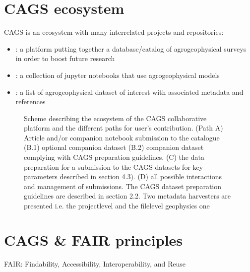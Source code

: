 \documentclass[letterpaper,10pt,english]{sphinxmanual}
\begin{document}
\chapter{CAGS ecosystem}
\label{\detokenize{CAGS_ecosystem:cags-ecosystem}}\label{\detokenize{CAGS_ecosystem::doc}}
\sphinxAtStartPar
CAGS is an ecosystem with many interrelated projects and repositories:
\begin{itemize}
\item {} 
\sphinxAtStartPar
{}: a platform putting together a database/catalog of agrogeophysical surveys in order to boost future research

\item {} 
\sphinxAtStartPar
{}: a collection of jupyter notebooks that use agrogeophysical models

\end{itemize}

\sphinxAtStartPar
{}
\begin{itemize}
\item {} 
\sphinxAtStartPar
{}: a list of agrogeophysical dataset of interest with associated metadata and references

\end{itemize}

\sphinxAtStartPar
{}

\begin{figure}[htbp]
\centering
\capstart

\noindent{}
\caption{Scheme describing the ecosystem of the CAGS collaborative platform and the different paths for user’s contribution. (Path A) Article and/or companion notebook submission to the catalogue (B.1) optional companion dataset (B.2) companion dataset complying with CAGS preparation guidelines. (C) the data preparation for a submission to the CAGS datasets for key parameters described in section 4.3). (D) all possible interactions and management of submissions. The CAGS dataset preparation guidelines are described in section 2.2. Two metadata harvesters are presented i.e. the project\sphinxhyphen{}level and the file\sphinxhyphen{}level geophysics one}\label{\detokenize{CAGS_ecosystem:id2}}\label{\detokenize{CAGS_ecosystem:importing}}\end{figure}


\chapter{CAGS \& FAIR principles}
\label{\detokenize{FAIR:cags-fair-principles}}\label{\detokenize{FAIR::doc}}
\sphinxAtStartPar
FAIR: Findability, Accessibility, Interoperability, and Reuse
\end{document}
